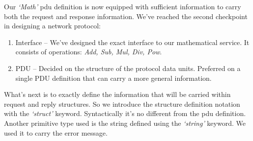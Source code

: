 \documentclass[times, utf8, diplomski]{fer}
\begin{document}
Our \emph{`Math'} pdu definition is now equipped with sufficient information to 
carry both the request and response information. We've reached the second checkpoint 
in designing a network protocol:
\begin{enumerate}
	\item Interface – We've designed the exact interface to our mathematical 
		service. It consists of operations: \emph{Add, Sub, Mul, Div, Pow}.
	\item PDU – Decided on the structure of the protocol data units. Preferred 
		on a single PDU definition that can carry a more general information.
\end{enumerate}

What's next is to exactly define the information that will be carried within 
request and reply structures. So we introduce the structure definition notation 
with the \emph{`struct'} keyword. Syntactically it's no different from the pdu definition.
Another primitive type used is the string defined using the \emph{`string'} 
keyword. We used it to carry the error message.
\lstset{language=IDL}
\lstset{basicstyle=\tiny}
\lstset{numbers=left, numberstyle=\tiny, stepnumber=1, numbersep=5pt}
\end{document}
